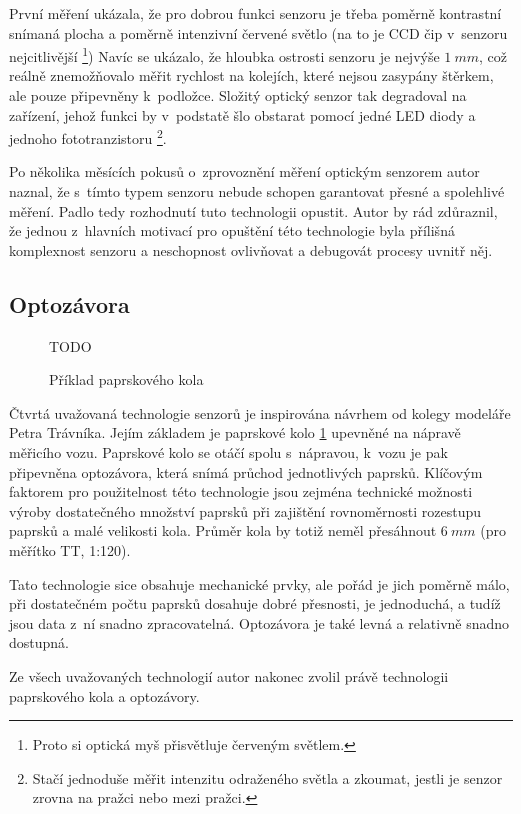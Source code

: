 První měření ukázala, že pro dobrou funkci senzoru je třeba poměrně kontrastní
snímaná plocha a poměrně intenzivní červené světlo (na to je CCD čip v~senzoru
nejcitlivější \footnote{Proto si optická myš přisvětluje červeným světlem.})
Navíc se ukázalo, že hloubka ostrosti senzoru je nejvýše $1\ mm$, což reálně
znemožňovalo měřit rychlost na kolejích, které nejsou zasypány štěrkem, ale
pouze připevněny k~podložce. Složitý optický senzor tak degradoval na zařízení,
jehož funkci by v~podstatě šlo obstarat pomocí jedné LED diody a jednoho
fototranzistoru \footnote{Stačí jednoduše měřit intenzitu odraženého světla a
zkoumat, jestli je senzor zrovna na pražci nebo mezi pražci.}.

Po několika měsících pokusů o~zprovoznění měření optickým senzorem autor naznal,
že s~tímto typem senzoru nebude schopen garantovat přesné a spolehlivé měření.
Padlo tedy rozhodnutí tuto technologii opustit. Autor by rád zdůraznil, že
jednou z~hlavních motivací pro opuštění této technologie byla přílišná
komplexnost senzoru a neschopnost ovlivňovat a debugovát procesy uvnitř něj.

\subsection{Optozávora}
\label{subsec:wsm-senzor-optozavora}

\begin{figure}[h]
TODO
\caption{Příklad paprskového kola}
\label{fig:wheel}
\end{figure}

Čtvrtá uvažovaná technologie senzorů je inspirována návrhem od kolegy modeláře
Petra Trávníka. Jejím základem je paprskové kolo \ref{fig:wheel}
upevněné na nápravě měřicího vozu. Paprskové kolo se otáčí spolu s~nápravou,
k~vozu je pak připevněna optozávora, která snímá průchod jednotlivých paprsků.
Klíčovým faktorem pro použitelnost této technologie jsou zejména technické
možnosti výroby dostatečného množství paprsků při zajištění rovnoměrnosti
rozestupu paprsků a malé velikosti kola. Průměr kola by totiž neměl přesáhnout
$6\ mm$ (pro měřítko TT, 1:120).

Tato technologie sice obsahuje mechanické prvky, ale pořád je jich poměrně
málo, při dostatečném počtu paprsků dosahuje dobré přesnosti, je jednoduchá, a
tudíž jsou data z~ní snadno zpracovatelná. Optozávora je také levná a relativně
snadno dostupná.

Ze všech uvažovaných technologií autor nakonec zvolil právě technologii
paprskového kola a optozávory.

